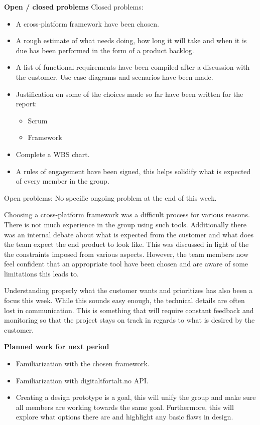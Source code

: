 \begin{appendices}
		\textbf{Open / closed problems}\newline
		Closed problems:
		\begin{itemize}
			\item A cross-platform framework have been chosen.
			\item A rough estimate of what needs doing, how long it will take and when it is due has been performed in the form of a product backlog.
			\item A list of functional requirements have been compiled after a discussion with the customer.
			Use case diagrams and scenarios have been made.
			\item Justification on some of the choices made so far have been written for the report:
			\begin{itemize}
				\item Scrum
				\item Framework
			\end{itemize}
			\item Complete a WBS chart.
			\item A rules of engagement have been signed, this helps solidify what is expected of every member in the group.\newline
		\end{itemize}
		
		Open problems:\newline
		No specific ongoing problem at the end of this week.\newline
		
		Choosing a cross-platform framework was a difficult process for various reasons. There is not much experience in the group using such tools. Additionally there was an internal debate about what is expected from the customer and what does the team expect the end product to look like. This was discussed in light of the the constraints imposed from various aspects. However, the team members now feel confident that an appropriate tool have been chosen and are aware of some limitations this leads to.\newline
		
		Understanding properly what the customer wants and prioritizes has also been a focus this week. While this sounds easy enough, the technical details are often lost in communication. This is something that will require constant feedback and monitoring so that the project stays on track in regards to what is desired by the customer.\newline
		
		\textbf{Planned work for next period}\newline
		\begin{itemize}
			\item Familiarization with the chosen framework.
			\item Familiarization with digitaltfortalt.no API.
			\item Creating a design prototype is a goal, this will unify the group and make sure all members are working towards the same goal. Furthermore, this will explore what options there are and highlight any basic flaws in design.
		\end{itemize}
\raggedbottom
\newpage		


\end{appendices}
